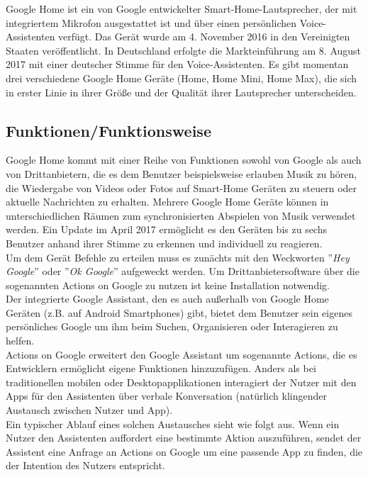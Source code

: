 
Google Home ist ein von Google entwickelter Smart-Home-Lautsprecher, der mit integriertem Mikrofon ausgestattet ist und über einen persönlichen Voice-Assistenten verfügt. Das Gerät wurde am 4. November 2016 in den Vereinigten Staaten veröffentlicht. In Deutschland erfolgte die Markteinführung am 8. August 2017 mit einer deutscher Stimme für den Voice-Assistenten.
Es gibt momentan drei verschiedene Google Home Geräte (Home, Home Mini, Home Max), die sich in erster Linie in ihrer Größe und der Qualität ihrer Lautsprecher unterscheiden.\\

\subsection{Funktionen/Funktionsweise}

Google Home kommt mit einer Reihe von Funktionen sowohl von Google als auch von Drittanbietern, die es dem Benutzer beispielsweise erlauben Musik zu hören, die Wiedergabe von Videos oder Fotos auf Smart-Home Geräten zu steuern oder aktuelle Nachrichten zu erhalten. Mehrere Google Home Geräte können in unterschiedlichen Räumen zum synchronisierten Abspielen von Musik verwendet werden. Ein Update im April 2017 ermöglicht es den Geräten bis zu sechs Benutzer anhand ihrer Stimme zu erkennen und individuell zu reagieren.\\
Um dem Gerät Befehle zu erteilen muss es zunächts mit den Weckworten ''\textit{Hey Google}'' oder ''\textit{Ok Google}'' aufgeweckt werden.
Um Drittanbietersoftware über die sogenannten Actions on Google zu nutzen ist keine Installation notwendig.\\
Der integrierte Google Assistant, den es auch außerhalb von Google Home Geräten (z.B. auf Android Smartphones) gibt, bietet dem Benutzer sein eigenes persönliches Google um ihm beim Suchen, Organisieren oder Interagieren zu helfen.\\
Actions on Google erweitert den Google Assistant um sogenannte Actions, die es Entwicklern ermöglicht eigene Funktionen hinzuzufügen. Anders als bei traditionellen mobilen oder Desktopapplikationen interagiert der Nutzer mit den Apps für den Assistenten über verbale Konversation (natürlich klingender Austausch zwischen Nutzer und App).\\
Ein typischer Ablauf eines solchen Austausches sieht wie folgt aus. Wenn ein Nutzer den Assistenten auffordert eine bestimmte Aktion auszuführen, sendet der Assistent eine Anfrage an Actions on Google um eine passende App zu finden, die der Intention des Nutzers entspricht.
